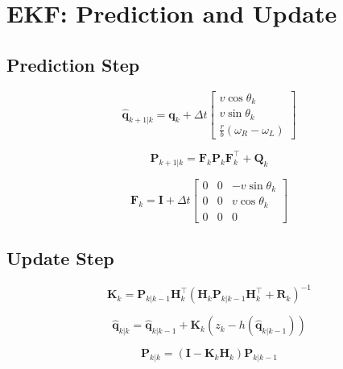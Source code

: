 \documentclass[11pt]{article}
\begin{document}
\section{EKF: Prediction and Update}

\subsection{Prediction Step}

\begin{equation}
\hat{\mathbf{q}}_{k+1|k} =
\mathbf{q}_k + \Delta t
\begin{bmatrix}
v\cos\theta_k \\
v\sin\theta_k \\
\frac{r}{b}(\omega_R - \omega_L)
\end{bmatrix}
\end{equation}

\begin{equation}
\mathbf{P}_{k+1|k} =
\mathbf{F}_k \mathbf{P}_k \mathbf{F}_k^\top + \mathbf{Q}_k
\end{equation}

\begin{equation}
\mathbf{F}_k = \mathbf{I} + \Delta t
\begin{bmatrix}
0 & 0 & -v\sin\theta_k \\
0 & 0 & v\cos\theta_k \\
0 & 0 & 0
\end{bmatrix}
\end{equation}

\subsection{Update Step}

\begin{equation}
\mathbf{K}_k =
\mathbf{P}_{k|k-1}\mathbf{H}_k^\top
\left(\mathbf{H}_k \mathbf{P}_{k|k-1} \mathbf{H}_k^\top + \mathbf{R}_k \right)^{-1}
\end{equation}

\begin{equation}
\hat{\mathbf{q}}_{k|k} =
\hat{\mathbf{q}}_{k|k-1} +
\mathbf{K}_k \left(z_k - h(\hat{\mathbf{q}}_{k|k-1})\right)
\end{equation}

\begin{equation}
\mathbf{P}_{k|k} =
(\mathbf{I} - \mathbf{K}_k \mathbf{H}_k)\mathbf{P}_{k|k-1}
\end{equation}
\end{document}
